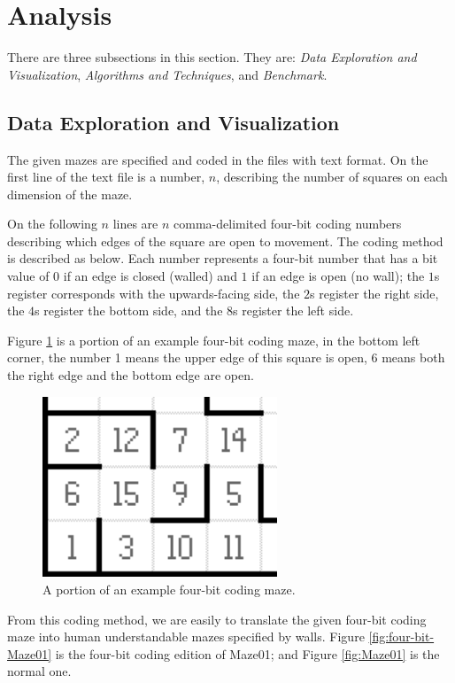 \documentclass[11pt, oneside]{article}   	%
\begin{document}
\section{Analysis}
There are three subsections in this section. They are: {\it Data Exploration and Visualization}, {\it Algorithms and Techniques}, and {\it Benchmark}.
\subsection{Data Exploration and Visualization}
The given mazes are specified and coded in the files with text format. On the first line of the text file is a number, $n$, describing the number of squares on each dimension of the maze. 

On the following $n$ lines are $n$ comma-delimited four-bit coding numbers describing which edges of the square are open to movement. The coding method is described as below. Each number represents a four-bit number that has a bit value of $0$ if an edge is closed (walled) and $1$ if an edge is open (no wall); the $1$s register corresponds with the upwards-facing side, the $2$s register the right side, the $4$s register the bottom side, and the $8$s register the left side.

Figure {\ref {fig:example}} is a portion of an example four-bit coding maze, in the bottom left corner, the number 1 means the upper edge of this square is open, 6 means both the right edge and the bottom edge are open.

\begin{figure}[htbp] %
   \centering
   \includegraphics[width=7cm]{example.png} 
   \caption{A portion of an example four-bit coding maze.}
   \label{fig:example} 
\end{figure}

From this coding method, we are easily to translate the given four-bit coding maze into human understandable mazes specified by walls. Figure {\ref {fig:four-bit-Maze01}} is the four-bit coding edition of Maze01; and Figure {\ref {fig:Maze01}} is the normal one.
\end{document}
